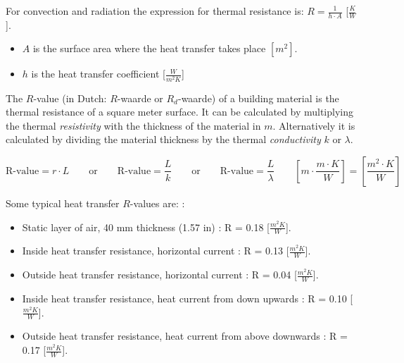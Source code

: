 For convection and radiation the expression for thermal resistance is: $R = \frac{1}{h \cdot A}$ [$\frac{K}{W}$].

\begin{itemize}
    \item $A$ is the surface area where the heat transfer takes place $[m^2]$.
    \item $h$ is the heat transfer coefficient  [$\frac{W}{m^2K}$]
\end{itemize}


The $R$-value (in Dutch: $R$-waarde or $R_d$-waarde) of a building material \cite{Rvalues_insulation} is the thermal resistance of a square meter surface.
It can be calculated by multiplying the thermal \emph{resistivity} with the thickness of the material in  $m$.
Alternatively it is calculated by dividing the material thickness by the thermal \emph{conductivity} $k$ or $\lambda$.

\begin{equation}
	\text{R-value} = r \cdot L  \qquad \text{or} \qquad  \text{R-value} = \frac{L}{k}  \qquad \text{or} \qquad  
	\text{R-value} = \frac{L}{\lambda}  \qquad \left[m \cdot \frac{m \cdot K}{W} \right] = \left[\frac{m^2 \cdot K}{W}\right] 
\end{equation}


Some typical heat transfer $R$-values are: \cite{OVERALL}: 

\begin{itemize}
	\item Static layer of air, 40 mm thickness (1.57 in)  : R = 0.18 [$\frac{m^2K}{W}$].
	\item Inside heat transfer resistance, horizontal current : R = 0.13 [$\frac{m^2K}{W}$]. 
	\item Outside heat transfer resistance, horizontal current : R = 0.04 [$\frac{m^2K}{W}$].
	\item Inside heat transfer resistance, heat current from down upwards : R = 0.10 [$\frac{m^2K}{W}$].
	\item Outside heat transfer resistance, heat current from above downwards : R = 0.17 [$\frac{m^2K}{W}$].
\end{itemize}


